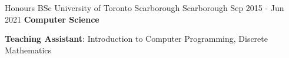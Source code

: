 
\begin{cventries}
  \cventry
    {Honours BSc}
    {University of Toronto Scarborough}
    {Scarborough}
    {Sep 2015 - Jun 2021}
    {\textbf{Computer Science}}
    {
      \begin{cvitems}
        \item {\textbf{Teaching Assistant}: Introduction to Computer Programming, Discrete Mathematics}
      \end{cvitems}
    }
\end{cventries}
